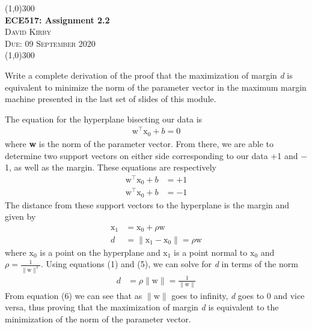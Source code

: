 \documentclass[11pt]{article}
\begin{document}
    \begin{center}
    \line(1,0){300}\\[0.25cm]
 	\Large{\bfseries ECE517: Assignment 2.2}\\
 	\textsc{\large David Kirby}\\
 	\textsc{\large Due: 09 September 2020}\\
 	\line(1,0){300}\\[0.75cm]
     \end{center}

\noindent Write a complete derivation of the proof that the maximization of margin \textit{d} is equivalent to minimize the norm of the parameter vector in the maximum margin machine presented in the last set of slides of this module.\par

\noindent The equation for the hyperplane bisecting our data is
\begin{align}
	\bm{\mathrm{w^\top x_{0}}}+b=0
\end{align}
where \textbf{w} is the norm of the parameter vector. From there, we are able to determine two support vectors on either side corresponding to our data +1 and \(-\)1, as well as the margin. These equations are respectively
\begin{align}
	\bm{\mathrm{w^\top x_{0}}}+b&=+1\\
	\bm{\mathrm{w^\top x_{0}}}+b&=-1
\end{align}
The distance from these support vectors to the hyperplane is the margin and given by
\begin{align}
	\bm{\mathrm{x_1}} &=\bm{\mathrm{x_{0}}}+\rho\bm{\mathrm{w}}\\
	d&=\parallel\bm{\mathrm{x_1}}-\bm{\mathrm{x_{0}}}\parallel=\rho\bm{\mathrm{w}}
\end{align}
where \(\bm{\mathrm{x_{0}}}\) is a point on the hyperplane and \(\bm{\mathrm{x_1}}\) is a point normal to \(\bm{\mathrm{x_{0}}}\) and \(\rho=\frac{1}{\parallel\bm{\mathrm{w}}\parallel^2}\). Using equations (1) and (5), we can solve for \textit{d} in terms of the norm
\begin{align}
	d&=\rho\parallel\bm{\mathrm{w}}\parallel=\frac{1}{\parallel\bm{\mathrm{w}}\parallel}
\end{align}
From equation (6) we can see that as \(\parallel\bm{\mathrm{w}}\parallel \) goes to infinity, \textit{d} goes to 0 and vice versa, thus proving that the maximization of margin \textit{d} is equivalent to the minimization of the norm of the parameter vector.
\end{document}
